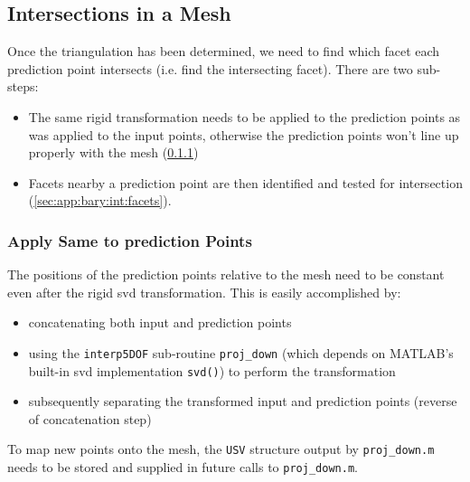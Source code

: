 \documentclass[final,twocolumn,12pt]{elsarticle}
\newcommand{\inpt}{input}
\newcommand{\outpt}{prediction}
\begin{document}
{\begin{appendices}
\subsection{Intersections in a  Mesh}
\label{sec:app:bary:int}

Once the triangulation has been determined, we need to find which facet each \outpt{} point intersects (i.e. find the intersecting facet). There are two sub-steps:
\begin{itemize}
    \item[2.1] The same rigid transformation needs to be applied to the \outpt{} points as was applied to the \inpt{} points, otherwise the \outpt{} points won't line up properly with the mesh (\cref{sec:app:bary:int:out-svd})
    \item[2.2] Facets nearby a \outpt{} point are then identified and tested for intersection (\cref{sec:app:bary:int:facets}).
\end{itemize}
\subsubsection{Apply Same  to \outpt{} Points}
\label{sec:app:bary:int:out-svd}
The positions of the \outpt{} points relative to the mesh need to be constant even after the rigid \gls{svd} transformation. %
This is easily accomplished by:
\begin{itemize}
    \item[2.1a] concatenating both \inpt{} and
\outpt{} points
    \item[2.1b] using the \texttt{interp5DOF} sub-routine \texttt{proj\_down} (which depends on MATLAB's built-in \gls{svd} implementation \texttt{svd()}) to perform the transformation
    \item[2.1c] subsequently separating the transformed \inpt{} and \outpt{} points (reverse of concatenation step)
\end{itemize}

To map new points onto the mesh, the \texttt{USV} structure output by \texttt{proj\_down.m} needs to be stored and supplied in future calls to \texttt{proj\_down.m}.



\end{appendices}}
\end{document}
